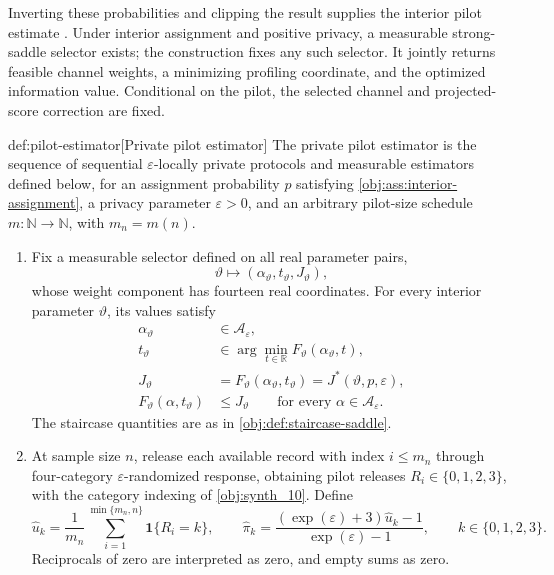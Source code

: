 \documentclass[11pt]{article}
\begin{document}
Inverting these probabilities and clipping the result supplies the interior pilot estimate . Under interior assignment and positive privacy, a measurable strong-saddle selector exists; the construction fixes any such selector. It jointly returns feasible channel weights, a minimizing profiling coordinate, and the optimized information value. Conditional on the pilot, the selected channel and projected-score correction are fixed.

\begin{algorithmv}{def:pilot-estimator}[Private pilot estimator]
The private pilot estimator is the sequence of sequential \(\varepsilon\)-locally private protocols and measurable estimators defined below, for an assignment probability \(p\) satisfying \cref{obj:ass:interior-assignment}, a privacy parameter \(\varepsilon>0\), and an arbitrary pilot-size schedule \(m:\mathbb N\to\mathbb N\), with \(m_n=m(n)\).
\begin{enumerate}
\item Fix a measurable selector defined on all real parameter pairs,
\[
\vartheta\longmapsto
(\alpha_{\vartheta},t_{\vartheta},J_{\vartheta}),
\]
whose weight component has fourteen real coordinates. For every interior parameter \(\vartheta\), its values satisfy
\[
\begin{aligned}
\alpha_{\vartheta}&\in\mathcal A_\varepsilon,\\
t_{\vartheta}&\in\arg\min_{t\in\mathbb R}
F_{\vartheta}(\alpha_{\vartheta},t),\\
J_{\vartheta}
&=F_{\vartheta}(\alpha_{\vartheta},t_{\vartheta})
=J^*(\vartheta,p,\varepsilon),\\
F_{\vartheta}(\alpha,t_{\vartheta})
&\le J_{\vartheta}
\qquad\text{for every }\alpha\in\mathcal A_\varepsilon.
\end{aligned}
\]
The staircase quantities are as in \cref{obj:def:staircase-saddle}.

\item At sample size \(n\), release each available record with index \(i\le m_n\) through four-category \(\varepsilon\)-randomized response, obtaining pilot releases \(R_i\in\{0,1,2,3\}\), with the category indexing of \cref{obj:synth_10}. Define
\[
\widehat u_k
=\frac{1}{m_n}
\sum_{i=1}^{\min\{m_n,n\}}\mathbf 1\{R_i=k\},
\qquad
\widehat\pi_k
=\frac{(\exp(\varepsilon)+3)\widehat u_k-1}
{\exp(\varepsilon)-1},
\qquad k\in\{0,1,2,3\}.
\]
Reciprocals of zero are interpreted as zero, and empty sums as zero.


\end{enumerate}
\end{algorithmv}
\end{document}
